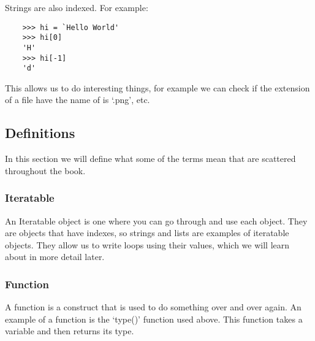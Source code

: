 Strings are also indexed. For example:

\begin{lstlisting}
    >>> hi = `Hello World'
    >>> hi[0]
    'H'
    >>> hi[-1]
    'd'
\end{lstlisting}

This allows us to do interesting things, for example we can check if the
extension of a file have the name of is `.png', etc.

\subsection{Definitions}

In this section we will define what some of the terms mean that are scattered
throughout the book.

\subsubsection{Iteratable}

An Iteratable object is one where you can go through and use each object. They
are objects that have indexes, so strings and lists are examples of iteratable
objects. They allow us to write loops using their values, which we will learn
about in more detail later.

\subsubsection{Function}

A function is a construct that is used to do something over and over again.
An example of a function is the `type()' function used above. This function
takes a variable and then returns its type.
